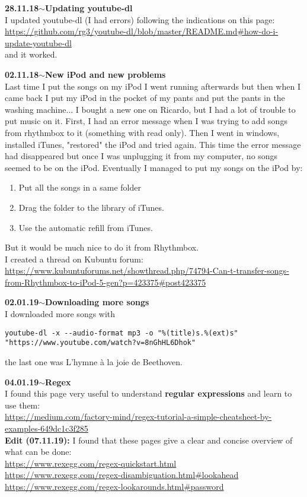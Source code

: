 \documentclass[11pt,a4paper]{article}
\newenvironment{loggentry}[2]%
{\noindent\textbf{#1}\hspace{1cm}$\mathbf{\sim}$\text{ }\textbf{#2}\\}{\vspace{0.5cm}}
\begin{document}
\begin{loggentry}{28.11.18}{Updating youtube-dl}
I updated youtube-dl (I had errors) following the indications on this page:\\
\url{https://github.com/rg3/youtube-dl/blob/master/README.md#how-do-i-update-youtube-dl}\\
and it worked.
\end{loggentry}

\begin{loggentry}{02.11.18}{New iPod and new problems}
Last time I put the songs on my iPod I went running afterwards but then when I came back I put my iPod in the pocket of my pants and put the pants in the washing machine...
I bought a new one on Ricardo, but I had a lot of trouble to put music on it. First, I had an error message when I was trying to add songs from rhythmbox to it (something with read only). Then I went in windows, installed iTunes, "restored" the iPod and tried again. This time the error message had disappeared but once I was unplugging it from my computer, no songs seemed to be on the iPod. Eventually I managed to put my songs on the iPod by:
\begin{enumerate}
\item Put all the songs in a same folder
\item Drag the folder to the library of iTunes.
\item Use the automatic refill from iTunes.
\end{enumerate}
But it would be much nice to do it from Rhythmbox.\\
I created a thread on Kubuntu forum:\\
\url{https://www.kubuntuforums.net/showthread.php/74794-Can-t-transfer-songs-from-Rhythmbox-to-iPod-5-gen?p=423375#post423375}\\
\end{loggentry}

\begin{loggentry}{02.01.19}{Downloading more songs}
I downloaded more songs with
\begin{verbatim}
youtube-dl -x --audio-format mp3 -o "%(title)s.%(ext)s" "https://www.youtube.com/watch?v=8nGhHL6Dhok"
\end{verbatim}
the last one was L'hymne à la joie de Beethoven.
\end{loggentry}

\begin{loggentry}{04.01.19}{Regex}
I found this page very useful to understand \textbf{regular expressions} and learn to use them:\\
\url{https://medium.com/factory-mind/regex-tutorial-a-simple-cheatsheet-by-examples-649dc1c3f285}\\
\textbf{Edit (07.11.19):} I found that these pages give a clear and concise overview of what can be done:\\
\url{https://www.rexegg.com/regex-quickstart.html}\\
\url{https://www.rexegg.com/regex-disambiguation.html#lookahead}\\
\url{https://www.rexegg.com/regex-lookarounds.html#password}\\
\end{loggentry}
\end{document}
